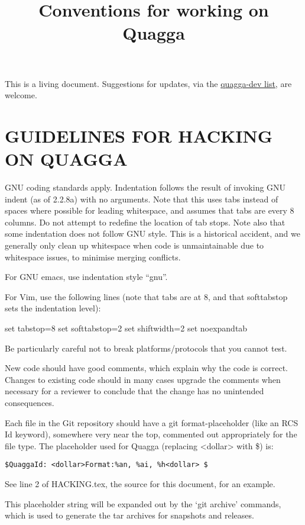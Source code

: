 \documentclass[oneside]{article}
\title{Conventions for working on Quagga}
\begin{document}
\maketitle

This is a living document. Suggestions for updates, via the
\href{http://lists.quagga.net/mailman/listinfo/quagga-dev}{quagga-dev list},
are welcome.

\tableofcontents

\section{GUIDELINES FOR HACKING ON QUAGGA}
\label{sec:guidelines}


GNU coding standards apply.  Indentation follows the result of
invoking GNU indent (as of 2.2.8a) with no arguments.  Note that this
uses tabs instead of spaces where possible for leading whitespace, and
assumes that tabs are every 8 columns.  Do not attempt to redefine the
location of tab stops.  Note also that some indentation does not
follow GNU style.  This is a historical accident, and we generally
only clean up whitespace when code is unmaintainable due to whitespace
issues, to minimise merging conflicts.

For GNU emacs, use indentation style ``gnu''.

For Vim, use the following lines (note that tabs are at 8, and that
softtabstop sets the indentation level):

set tabstop=8
set softtabstop=2
set shiftwidth=2
set noexpandtab

Be particularly careful not to break platforms/protocols that you
cannot test.

New code should have good comments, which explain why the code is correct.
Changes to existing code should in many cases upgrade the comments when
necessary for a reviewer to conclude that the change has no unintended
consequences.

Each file in the Git repository should have a git format-placeholder (like
an RCS Id keyword), somewhere very near the top, commented out appropriately
for the file type. The placeholder used for Quagga (replacing <dollar> with
\$) is:

	\verb|$QuaggaId: <dollar>Format:%an, %ai, %h<dollar> $|

See line 2 of HACKING.tex, the source for this document, for an example.

This placeholder string will be expanded out by the `git archive' commands,
which is used to generate the tar archives for snapshots and releases.
\end{document}
